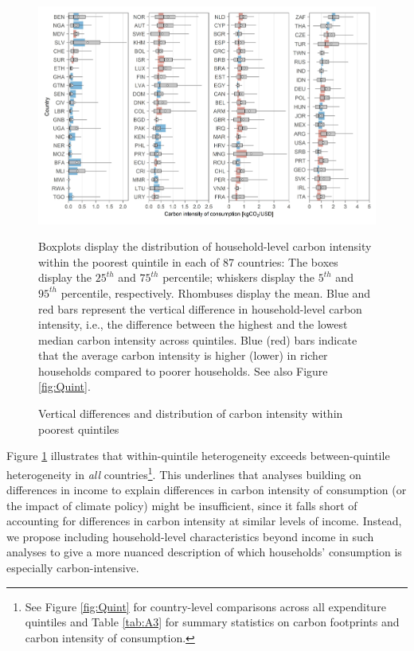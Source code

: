 \documentclass[12pt, a4paper]{article}
\newenvironment{subcaption2}
{\strut
\vspace{-5pt}
\begin{minipage}[b]{0.9\textwidth}
  \hspace*{-\parindent}
  \footnotesize}
 {\end{minipage}}
\begin{document}
\begin{figure}[ht!]
    \centering
    \includegraphics{Figure 1/Figure_1_2017}
    \caption{Vertical differences and distribution of carbon intensity within poorest quintiles}
    \label{fig:fig_1}
    \begin{subcaption2}
    Boxplots display the distribution of household-level carbon intensity within the poorest quintile in each of 87 countries: The boxes display the $25^{th}$ and $75^{th}$ percentile; whiskers display the $5^{th}$ and $95^{th}$ percentile, respectively. Rhombuses display the mean. Blue and red bars represent the vertical difference in household-level carbon intensity, i.e., the difference between the highest and the lowest median carbon intensity across quintiles. Blue (red) bars indicate that the average carbon intensity is higher (lower) in richer households compared to poorer households. See also Figure \ref{fig:Quint}.
    \end{subcaption2}
\end{figure}

Figure \ref{fig:fig_1} illustrates that within-quintile heterogeneity exceeds between-quintile heterogeneity in \textit{all} countries\footnote{See Figure \ref{fig:Quint} for country-level comparisons across all expenditure quintiles and Table \ref{tab:A3} for summary statistics on carbon footprints and carbon intensity of consumption.}. This underlines that analyses building on differences in income to explain differences in carbon intensity of consumption (or the impact of climate policy) might be insufficient, since it falls short of accounting for differences in carbon intensity at similar levels of income. Instead, we propose including household-level characteristics beyond income in such analyses to give a more nuanced description of which households' consumption is especially carbon-intensive.
\end{document}

